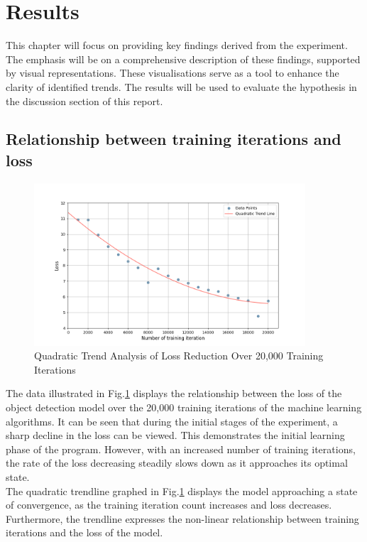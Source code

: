\section{Results}
This chapter will focus on providing key findings derived from the experiment.
The emphasis will be on a comprehensive description of these findings, supported by visual representations. These visualisations serve
as a tool to enhance the clarity of identified trends. The results will be used to evaluate the hypothesis in the discussion section of this report.

\subsection{Relationship between training iterations and loss}
\begin{figure}[h]
   \centering
   \includegraphics[width=0.9\textwidth]{../Data/loss_by_iteration_plot.png}
   \caption{Quadratic Trend Analysis of Loss Reduction Over 20,000 Training Iterations}
   \label{fig:loss-vs-training-iterations}
\end{figure}
The data illustrated in Fig.\ref{fig:loss-vs-training-iterations} displays the relationship between the loss of the object detection model over the 20,000 training iterations of the machine learning algorithms. It can be seen that during the initial stages of the experiment, a sharp decline in the loss can be viewed. This demonstrates the initial learning phase of the program. However, with an increased number of training iterations, the rate of the loss decreasing steadily slows down as it approaches its optimal state. \\

The quadratic trendline graphed in Fig.\ref{fig:loss-vs-training-iterations}  displays the model approaching a state of convergence, as the training iteration count increases and loss decreases. Furthermore, the trendline expresses the non-linear relationship between training iterations and the loss of the model. \\
\newpage

